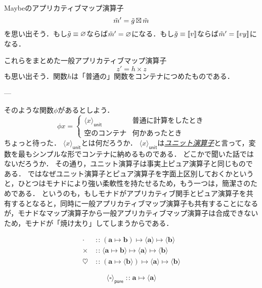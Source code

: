 \documentclass[a5paper,draft]{jsbook}
\def\[{\left[\!\left[}
\def\]{\right]\!\right]}
\newcommand{\keyword}[1]{{\underline{\emph{#1}}}}
\newcommand{\mathTypeParameter}[1]{\mathbf{#1}}
\newcommand{\mathSomething}{\square}
\newcommand{\mathBinaryOperator}[1]{\operatorname{#1}}
\newcommand{\mathIn}{\mathBinaryOperator{:\!:}}
\newcommand{\mathMapsTo}{\mapsto}
\newcommand{\mathMorph}[2]{#1\mathMapsTo#2}
\newcommand{\mathMorphII}[3]{#1\mathMapsTo#2\mathMapsTo#3}
\DeclareMathOperator{\hsklApplicativeMap}{\times}
\DeclareMathOperator{\hsklApplicativeMaybeMap}{\boxtimes}
\DeclareMathOperator{\hsklFmap}{\cdot}
\DeclareMathOperator{\hsklMonadMap}{\heartsuit}
\newcommand{\hsklNothing}{\varnothing}
\newcommand{\hsklJust}[1]{\[#1\]}
\newcommand{\hsklPure}[1]{\langle#1\rangle_\textsf{pure}}
\newcommand{\hsklUnit}[1]{\langle#1\rangle_\textsf{unit}}
\newcommand{\hsklMaybe}[1]{\Tilde{#1}}
\begin{document}
Maybeのアプリカティブマップ演算子$$\hsklMaybe{m}'=\hsklMaybe{g}\hsklApplicativeMaybeMap\hsklMaybe{m}$$を思い出そう．もし$\hsklMaybe{g}\equiv\hsklNothing$ならば$\hsklMaybe{m}'=\hsklNothing$になる．もし$\hsklMaybe{g}\equiv\hsklJust{v}$ならば$\hsklMaybe{m}'=\hsklJust{vy}$になる．

これらをまとめた一般アプリカティブマップ演算子$$z'=h\hsklApplicativeMap z$$も思い出そう．関数$h$は「普通の」関数をコンテナにつめたものである．


---

そのような関数$\phi$があるとしよう．
$$\phi x=\begin{cases}\hsklUnit{x}&\text{普通に計算をしたとき}\\
\text{空のコンテナ}&\text{何かあったとき}\end{cases}$$
ちょっと待った．
$\hsklUnit{x}$とは何だろうか．
$\hsklUnit{x}$は\keyword{ユニット演算子}と言って，変数を最もシンプルな形でコンテナに納めるものである．
どこかで聞いた話ではないだろうか．
その通り，ユニット演算子は事実上ピュア演算子と同じものである．
ではなぜユニット演算子とピュア演算子を字面上区別しておくかというと，ひとつはモナドにより強い柔軟性を持たせるため，もう一つは，簡潔さのためである．
というのも，もしモナドがアプリカティブ関手とピュア演算子を共有するとなると，同時に一般アプリカティブマップ演算子も共有することになるが，モナドなマップ演算子から一般アプリカティブマップ演算子は合成できないため，モナドが「焼け太り」してしまうからである．

\begin{align*}
\hsklFmap&\mathIn{}\mathMorphII{(\mathMorph{\mathTypeParameter{a}}{\mathTypeParameter{b}})}{\langle\mathTypeParameter{a}\rangle}{\langle\mathTypeParameter{b}
\rangle}\\
\hsklApplicativeMap&\mathIn{}\mathMorphII{\langle\mathMorph{\mathTypeParameter{a}}{\mathTypeParameter{b}}\rangle}{\langle\mathTypeParameter{a}\rangle}{\langle\mathTypeParameter{b}\rangle}\\
\hsklMonadMap&\mathIn{}\mathMorphII{(\mathMorph{\mathTypeParameter{a}}{\langle\mathTypeParameter{b}\rangle})}{\langle\mathTypeParameter{a}\rangle}{\langle{\mathTypeParameter{b}}\rangle}
\end{align*}

$$\hsklPure{\mathSomething}\mathIn\mathMorph{\mathTypeParameter{a}}{\langle\mathTypeParameter{a}\rangle}$$
\end{document}
